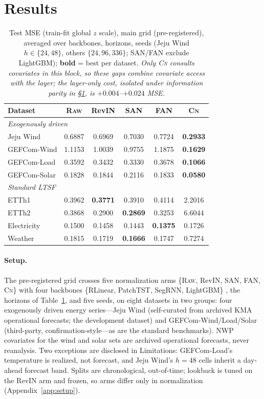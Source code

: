 \documentclass{article}
\newcommand{\rawm}{\textsc{Raw}}
\newcommand{\cnm}{\textsc{Cn}}
\begin{document}
\section{Results}\label{sec:results}
\begin{table}[t]
\centering\footnotesize
\setlength{\tabcolsep}{4pt}
\caption{Test MSE (train-fit global $z$ scale), main grid (pre-registered),
averaged over backbones, horizons, seeds (Jeju Wind $h\in\{24,48\}$, others
$\{24,96,336\}$; SAN/FAN exclude LightGBM); \textbf{bold} = best per dataset.
\emph{Only \cnm{} consults covariates in this block, so these gaps combine
covariate access with the layer; the layer-only cost, isolated under
information parity in \S\ref{sec:results}, is $+0.004$--$+0.024$ MSE.}}
\label{tab:mini}
\begin{tabular}{lccccc}
\toprule
Dataset & \rawm & RevIN & SAN & FAN & \cnm \\
\midrule
\multicolumn{6}{l}{\emph{Exogenously driven}} \\
Jeju Wind    & 0.6887 & 0.6969 & 0.7030 & 0.7724 & \textbf{0.2933} \\
GEFCom-Wind  & 1.1153 & 1.0039 & 0.9755 & 1.1875 & \textbf{0.1629} \\
GEFCom-Load  & 0.3592 & 0.3432 & 0.3330 & 0.3678 & \textbf{0.1066} \\
GEFCom-Solar & 0.1828 & 0.1844 & 0.2116 & 0.1833 & \textbf{0.0580} \\
\midrule
\multicolumn{6}{l}{\emph{Standard LTSF}} \\
ETTh1        & 0.3962 & \textbf{0.3771} & 0.3910 & 0.4114 & 2.2016 \\
ETTh2        & 0.3868 & 0.2900 & \textbf{0.2869} & 0.3253 & 6.6044 \\
Electricity  & 0.1500 & 0.1458 & 0.1443 & \textbf{0.1375} & 0.1726 \\
Weather      & 0.1815 & 0.1719 & \textbf{0.1666} & 0.1747 & 0.7274 \\
\bottomrule
\end{tabular}
\end{table}

\paragraph{Setup.} The pre-registered grid crosses five normalization arms
\{\rawm, RevIN, SAN, FAN, \cnm\} \citep{kim2022revin,liu2023san,ye2024fan} with
four backbones \{RLinear, PatchTST, SegRNN, LightGBM\}
\citep{li2023rlinear,nie2023patchtst,lin2023segrnn,ke2017lightgbm}, the horizons
of Table~\ref{tab:mini}, and five seeds, on eight datasets in two groups: four
exogenously driven energy series---Jeju Wind (self-curated from archived KMA
operational forecasts; the development dataset) and GEFCom-Wind/Load/Solar
\citep{hong2016gefcom} (third-party, confirmation-style---as are the standard
benchmarks). NWP covariates
for the wind and solar sets are archived operational forecasts, never reanalysis.
Two exceptions are disclosed in Limitations: GEFCom-Load's temperature is
realized, not forecast, and Jeju Wind's $h{=}48$ cells inherit a
day-ahead forecast band. Splits are chronological, out-of-time; lookback is
tuned on the RevIN arm and frozen, so arms differ only in normalization
(Appendix~\ref{app:setup}).
\end{document}
